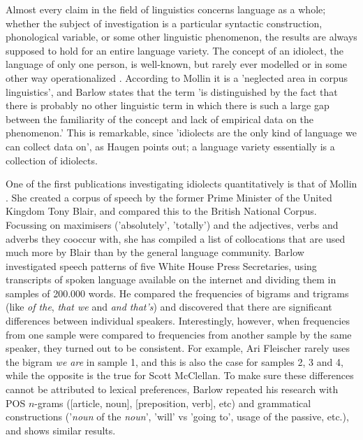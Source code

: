 \documentclass[11pt]{article}
\begin{document}
Almost every claim in the field of linguistics concerns language as a whole; whether the subject of investigation is a particular syntactic construction, phonological variable, or some other linguistic phenomenon, the results are always supposed to hold for an entire language variety. The concept of an idiolect, the language of only one person, is well-known, but rarely ever modelled or in some other way operationalized \cite{mollin09,barlow10,louwerse04}. According to Mollin  it is a 'neglected area in corpus linguistics', and Barlow  states that the term 'is distinguished by the fact that there is probably no other linguistic term in which there is such a large gap between the familiarity of the concept and lack of empirical data on the phenomenon.' This is remarkable, since 'idiolects are the only kind of language we can collect data on', as Haugen  points out; a language variety essentially is a collection of idiolects.

One of the first publications investigating idiolects quantitatively is that of Mollin . She created a corpus of speech by the former Prime Minister of the United Kingdom Tony Blair, and compared this to the British National Corpus. Focussing on maximisers ('absolutely', 'totally') and the adjectives, verbs and adverbs they cooccur with, she has compiled a list of collocations that are used much more by Blair than by the general language community. Barlow  investigated speech patterns of five White House Press Secretaries, using transcripts of spoken language available on the internet and dividing them in samples of 200.000 words. He compared the frequencies of bigrams and trigrams (like \emph{of the}, \emph{that we} and \emph{and that's}) and discovered that there are significant differences between individual speakers. Interestingly, however, when frequencies from one sample were compared to frequencies from another sample by the same speaker, they turned out to be consistent. For example, Ari Fleischer rarely uses the bigram \emph{we are} in sample 1, and this is also the case for samples 2, 3 and 4, while the opposite is the true for Scott McClellan. To make sure these differences cannot be attributed to lexical preferences, Barlow repeated his research with POS $n$-grams ([article, noun], [preposition, verb], etc) and grammatical constructions ('\emph{noun} of the \emph{noun}',  'will' vs 'going to', usage of the passive, etc.), and shows similar results.
\end{document}

